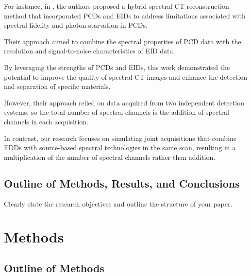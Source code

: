 \documentclass[12pt]{article}
\begin{document}
For instance, in \cite{clark2017hybrid}, the authors proposed a hybrid spectral CT reconstruction method that incorporated PCDs and EIDs to address limitations associated with spectral fidelity and photon starvation in PCDs. 

Their approach aimed to combine the spectral properties of PCD data with the resolution and signal-to-noise characteristics of EID data.


By leveraging the strengths of PCDs and EIDs, this work demonstrated the potential to improve the quality of spectral CT images and enhance the detection and separation of specific materials.

However, their approach relied on data acquired from two independent detection systems, so the total number of spectral channels is the addition of spectral channels in each acquisition.


In contrast, our research focuses on simulating joint acquisitions that combine EDDs with source-based spectral technologies in the same scan, resulting in a multiplication of the number of spectral channels rather than addition. 






\subsection{Outline of Methods, Results, and Conclusions}
\label{subsec:intro_outline}

Clearly state the research objectives and outline the structure of your paper.

\section{Methods}
\label{sec:methods}

\subsection{Outline of Methods}
\label{subsec:methods_outline}
\end{document}
